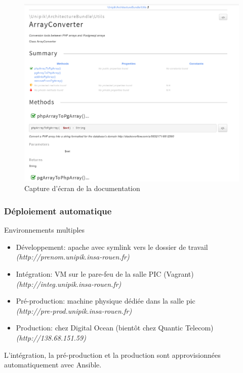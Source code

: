 \begin{frame}
      \begin{figure}[r]
		\includegraphics[scale=0.2]{images/doc.png}
		\caption{Capture d'écran de la documentation}
	  \end{figure}
\end{frame}

\begin{frame}
\frametitle{Déploiement automatique}
\begin{block}{Environnements multiples}
	\begin{itemize}
		\item Développement: apache avec symlink vers le dossier de travail \\
		\emph{\tiny(http://prenom.unipik.insa-rouen.fr)}
		\item Intégration: VM sur le pare-feu de la salle PIC (Vagrant) \\
		\emph{\tiny(http://integ.unipik.insa-rouen.fr)}
		\item Pré-production: machine physique dédiée dans la salle pic \\
		\emph{\tiny(http://pre-prod.unipik.insa-rouen.fr)}
		\item Production: chez Digital Ocean (bientôt chez Quantic Telecom) \\
		\emph{\tiny(http://138.68.151.59)}
	\end{itemize}
\end{block}

L'intégration, la pré-production et la production sont approvisionnées automatiquement avec Ansible.

\end{frame}
